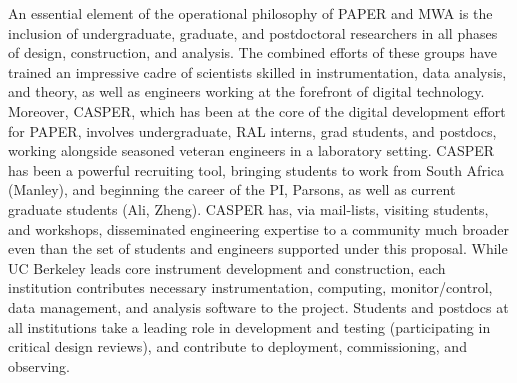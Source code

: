 \documentclass[preprint]{aastex}
\begin{document}
An essential element of the operational philosophy of PAPER and MWA is
the inclusion of undergraduate, graduate, and postdoctoral researchers in all
phases of design, construction, and analysis.  The combined efforts of these
groups have trained an impressive cadre of scientists skilled in
instrumentation, data analysis, and theory, as well as engineers working at the
forefront of digital technology.
Moreover, CASPER, which has been at the core of the digital development effort
for PAPER, involves undergraduate, RAL interns, grad students, and
postdocs, working alongside seasoned veteran engineers in a laboratory setting.
CASPER has been a powerful recruiting tool, bringing students to work from
South Africa (Manley), and beginning the career of the PI, Parsons, as well as
current graduate students (Ali, Zheng).  
CASPER has, via mail-lists, visiting students, and workshops, disseminated
engineering expertise to a community much broader even than the set of students and
engineers supported under this proposal. 
While UC Berkeley leads core instrument development and construction,
each institution contributes necessary instrumentation, computing,
monitor/control, data management, and analysis software to the project.  
Students and postdocs at all institutions take a leading role in development and
testing (participating in critical design reviews), and 
contribute to deployment, commissioning, and observing.

\end{document}
